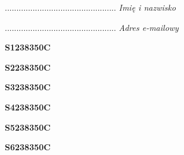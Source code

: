 \begin{turn}{90}\begin{minipage}{\linewidth} \vspace{20mm} ................................................  \textit{Imię i nazwisko}\end{minipage}\end{turn}

\begin{turn}{90}\begin{minipage}{\linewidth} \vspace{20mm} ................................................  \textit{Adres e-mailowy}\end{minipage}\end{turn}

\begin{turn}{90}\huge \begin{minipage}{\linewidth} \vspace{10mm}\textbf{S1238350C}\end{minipage}\end{turn}

\begin{turn}{90}\huge \begin{minipage}{\linewidth} \vspace{10mm}\textbf{S2238350C}\end{minipage}\end{turn}

\begin{turn}{90}\huge \begin{minipage}{\linewidth} \vspace{10mm}\textbf{S3238350C}\end{minipage}\end{turn}

\begin{turn}{90}\huge \begin{minipage}{\linewidth} \vspace{10mm}\textbf{S4238350C}\end{minipage}\end{turn}

\begin{turn}{90}\huge \begin{minipage}{\linewidth} \vspace{10mm}\textbf{S5238350C}\end{minipage}\end{turn}

\begin{turn}{90}\huge \begin{minipage}{\linewidth} \vspace{10mm}\textbf{S6238350C}\end{minipage}\end{turn}

